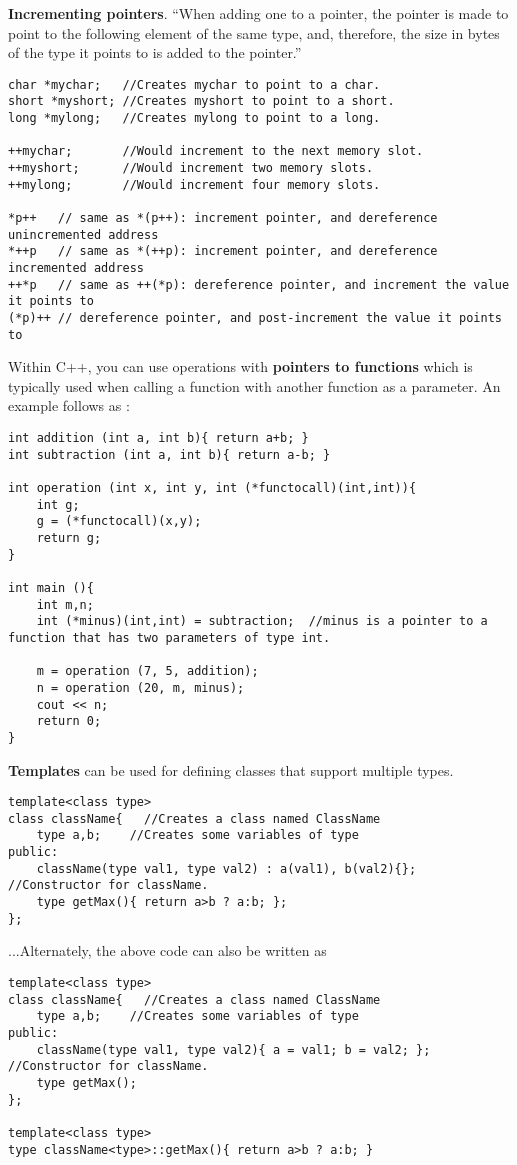 \textbf{Incrementing pointers}. ``When adding one to a pointer, the pointer is made to point to the following element of the same type, and, therefore, the size in bytes of the type it points to is added to the pointer.''
\begin{lstlisting}
char *mychar;   //Creates mychar to point to a char.
short *myshort; //Creates myshort to point to a short.
long *mylong;   //Creates mylong to point to a long.

++mychar;       //Would increment to the next memory slot.
++myshort;      //Would increment two memory slots.
++mylong;       //Would increment four memory slots.

*p++   // same as *(p++): increment pointer, and dereference unincremented address
*++p   // same as *(++p): increment pointer, and dereference incremented address
++*p   // same as ++(*p): dereference pointer, and increment the value it points to
(*p)++ // dereference pointer, and post-increment the value it points to 
\end{lstlisting}

Within C++, you can use operations with \textbf{pointers to functions} which is typically used when calling a function with another function as a parameter. An example follows as \cite{cpp:pointers}:
\begin{lstlisting}
int addition (int a, int b){ return a+b; }
int subtraction (int a, int b){ return a-b; }

int operation (int x, int y, int (*functocall)(int,int)){
	int g;
	g = (*functocall)(x,y);
	return g;
}

int main (){
	int m,n;
	int (*minus)(int,int) = subtraction;  //minus is a pointer to a function that has two parameters of type int.
	
	m = operation (7, 5, addition);
	n = operation (20, m, minus);
	cout << n;
	return 0;
}
\end{lstlisting}

\textbf{Templates} can be used for defining classes that support multiple types. 
\begin{lstlisting}
template<class type>
class className{   //Creates a class named ClassName
	type a,b;    //Creates some variables of type
public:
	className(type val1, type val2) : a(val1), b(val2){};  //Constructor for className.
	type getMax(){ return a>b ? a:b; };
};
\end{lstlisting}
...Alternately, the above code can also be written as
\begin{lstlisting}
template<class type>
class className{   //Creates a class named ClassName
	type a,b;    //Creates some variables of type
public:
	className(type val1, type val2){ a = val1; b = val2; };  //Constructor for className.
	type getMax();
};

template<class type>
type className<type>::getMax(){ return a>b ? a:b; }
\end{lstlisting}





